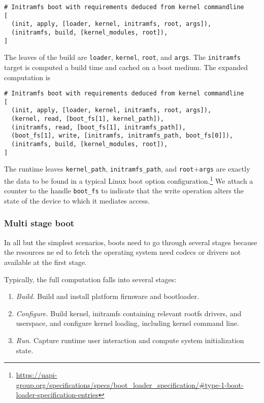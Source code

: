 \begin{lstlisting}
# Initramfs boot with requirements deduced from kernel commandline
[
  (init, apply, [loader, kernel, initramfs, root, args]),
  (initramfs, build, [kernel_modules, root]),
]
\end{lstlisting}

The leaves of the build are \texttt{loader}, \texttt{kernel}, \texttt{root}, and \texttt{args}. 
%
The \texttt{initramfs} target is computed a build time and cached on a boot medium.
%
The expanded computation is
\begin{lstlisting}
# Initramfs boot with requirements deduced from kernel commandline
[
  (init, apply, [loader, kernel, initramfs, root, args]),
  (kernel, read, [boot_fs[1], kernel_path]),
  (initramfs, read, [boot_fs[1], initramfs_path]),
  (boot_fs[1], write, [initramfs, initramfs_path, boot_fs[0]]),
  (initramfs, build, [kernel_modules, root]),
]
\end{lstlisting}
%
The runtime leaves \texttt{kernel\_path}, \texttt{initramfs\_path}, and \texttt{root}+\texttt{args} are exactly the data to be found in a typical Linux boot option configuration.\footnote{\url{https://uapi-group.org/specifications/specs/boot\_loader\_specification/\#type-1-boot-loader-specification-entries}}
%
We attach a counter to the handle \texttt{boot\_fs} to indicate that the write operation alters the state of the device to which it mediates access.


\subsubsection{Multi stage boot}

In all but the simplest scenarios, boots need to go through several stages because the resources ne ed to fetch the operating system need codecs or drivers not available at the first stage.

Typically, the full computation falls into several stages:
\begin{enumerate}
  \item \emph{Build.} Build and install platform firmware and bootloader.
  \item \emph{Configure.} Build kernel, initramfs containing relevant rootfs drivers, and userspace, and configure kernel loading, including kernel command line.
  \item \emph{Run.} Capture runtime user interaction and compute system initialization state.
\end{enumerate}

